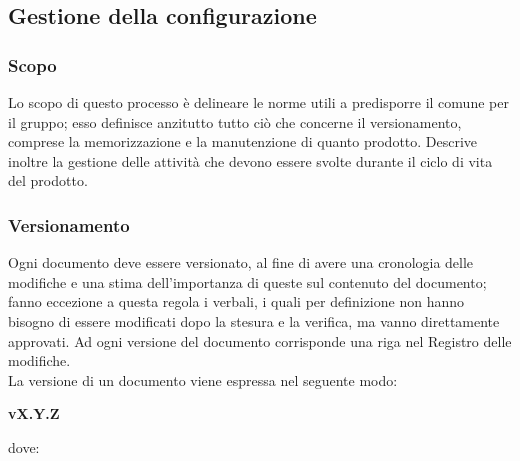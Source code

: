 \documentclass[../norme-di-progetto.tex]{subfiles}
\begin{document}
\subsection{Gestione della configurazione}
\subsubsection{Scopo}
Lo scopo di questo processo è delineare le norme utili a predisporre il  comune per il gruppo; esso definisce anzitutto tutto ciò che concerne il versionamento, comprese la memorizzazione e la manutenzione di quanto prodotto. Descrive inoltre la gestione delle attività che devono essere svolte durante il ciclo di vita del prodotto.

\subsubsection{Versionamento}
Ogni documento deve essere versionato, al fine di avere una cronologia delle modifiche e una stima dell'importanza di queste sul contenuto del documento; fanno eccezione a questa regola i verbali, i quali per definizione non hanno bisogno di essere modificati dopo la stesura e la verifica, ma vanno direttamente approvati. Ad ogni versione del documento corrisponde una riga nel Registro delle modifiche. \\
La versione di un documento viene espressa nel seguente modo: \\ \begin{center}
  \centering
  \textbf{vX.Y.Z}
\end{center} dove:
\end{document}
